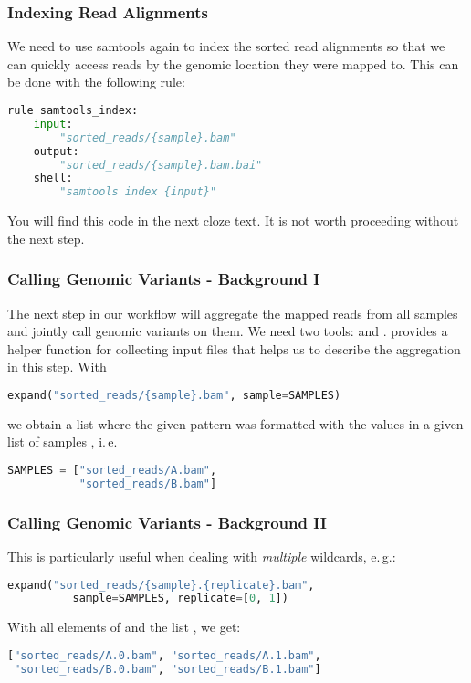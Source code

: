 \begin{frame}[fragile]
  \frametitle{Indexing Read Alignments}
  We need to use samtools again to index the sorted read alignments so that we can quickly access reads by the genomic location they were mapped to. This can be done with the following rule:
  \begin{lstlisting}[language=Python,style=Python]
rule samtools_index:
    input:
        "sorted_reads/{sample}.bam"
    output:
        "sorted_reads/{sample}.bam.bai"
    shell:
        "samtools index {input}"
  \end{lstlisting}
  \begin{hint}[Note]
  	You will find this code in the next cloze text. It is not worth proceeding without the next step.
  \end{hint}
\end{frame}

\begin{frame}[fragile]
 \frametitle{Calling Genomic Variants - Background I}
 The next step in our workflow will aggregate the mapped reads from all samples and jointly call genomic variants on them. We need two tools:  and . \newline \pause
 \Snakemake{} provides a helper function for collecting input files that helps us to describe the aggregation in this step. With
 \begin{lstlisting}[language=Python,style=Python]
expand("sorted_reads/{sample}.bam", sample=SAMPLES)
 \end{lstlisting}
 we obtain a list where the given pattern  was formatted with the values in a given list of samples , i.\,e.
 \begin{lstlisting}[language=Python,style=Python]
SAMPLES = ["sorted_reads/A.bam", 
           "sorted_reads/B.bam"]
 \end{lstlisting}
\end{frame}

\begin{frame}[fragile]
 \frametitle{Calling Genomic Variants - Background II}
 This is particularly useful when dealing with \emph{multiple} wildcards, e.\,g.:
 \begin{lstlisting}[language=Python,style=Python]
expand("sorted_reads/{sample}.{replicate}.bam", 
          sample=SAMPLES, replicate=[0, 1])
 \end{lstlisting}
 With all elements of  and the list \altverb{[0, 1]}, we get:
 \begin{lstlisting}[language=Python,style=Python]
["sorted_reads/A.0.bam", "sorted_reads/A.1.bam", 
 "sorted_reads/B.0.bam", "sorted_reads/B.1.bam"]
 \end{lstlisting}
\end{frame}
  
